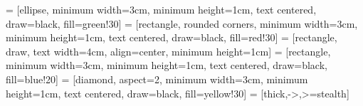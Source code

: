 \usepackage{cmap}			 %
\usepackage{mathtext} 		 %
\usepackage[T2A]{fontenc}	 %
\usepackage[utf8]{inputenc}	 %
\usepackage[russian]{babel}	 %

\usepackage{amsmath,amsfonts,amssymb,amsthm,mathtools}
\usepackage{icomma}


\usepackage{euscript}	 %
\usepackage{mathrsfs}    %

\makeatletter
\newcommand\thefontsize{The current font size is: \f@size pt} %
\makeatother

\makeatletter
\setlength{\headheight}{28pt}
\renewcommand\Huge{\@setfontsize\Huge{14pt}{10}}
\renewcommand\huge{\@setfontsize\huge{14pt}{10}}
\renewcommand\Large{\@setfontsize\Large{14pt}{10}}
\renewcommand\large{\@setfontsize\large{12pt}{10}}
\makeatother

\usepackage{tikz}
\usetikzlibrary{shapes.geometric, arrows, calc} %

 = [ellipse, minimum width=3cm, minimum height=1cm, text centered, draw=black, fill=green!30]
 = [rectangle, rounded corners, minimum width=3cm, minimum height=1cm, text centered, draw=black, fill=red!30]
 = [rectangle, draw, text width=4cm, align=center, minimum height=1cm]
 = [rectangle, minimum width=3cm, minimum height=1cm, text centered, draw=black, fill=blue!20]
 = [diamond, aspect=2, minimum width=3cm, minimum height=1cm, text centered, draw=black, fill=yellow!30]
 = [thick,->,>=stealth]

\usepackage{listings}
\usepackage{xcolor}


